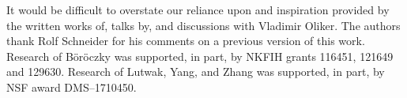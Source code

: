 \documentclass{cpamart1}     %
\theoremstyle{definition}
\theoremstyle{remark}
\begin{document}





\ack 


It would be difficult to overstate our reliance upon and inspiration provided by
the written works \cite{Ol2, Ol21, Ol} of, talks by, and discussions with Vladimir Oliker.
The authors thank Rolf Schneider for his comments on a previous version of this work. Research of B\"or\"oczky was supported, in part, by NKFIH grants 116451, 121649 and 129630. Research of Lutwak, Yang, and Zhang was supported, in part, by NSF award DMS--1710450.

\end{document}
